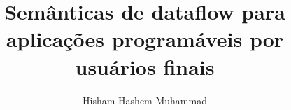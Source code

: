\documentclass[
  phd,
  american
]{ThesisPUC}
\author{Hisham Hashem Muhammad}
\title{Semânticas de dataflow para aplicações programáveis por usuários finais}
\begin{document}
  
  
  
  
  
  
  
  
  
  \arial
  
  \normalfont
  
\end{document}
